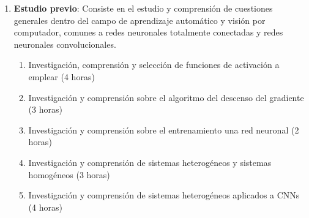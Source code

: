 \begin{enumerate}[label=\textbullet]
	\item \textbf{Estudio previo}: Consiste en el estudio y comprensión de cuestiones generales dentro del campo de aprendizaje automático y visión por computador, comunes a redes neuronales totalmente conectadas y redes neuronales convolucionales.
	\begin{enumerate}[label=\textbullet]
		\item Investigación, comprensión y selección de funciones de activación a emplear (4 horas)
		\item Investigación y comprensión sobre el algoritmo del descenso del gradiente (3 horas)
		\item Investigación y comprensión sobre el entrenamiento una red neuronal (2 horas)
		\item Investigación y comprensión de sistemas heterogéneos y sistemas homogéneos (3 horas)
		\item Investigación y comprensión de sistemas heterogéneos aplicados a CNNs (4 horas)
	\end{enumerate}
	

\end{enumerate}

